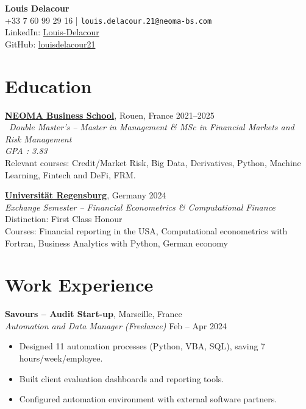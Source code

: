 \documentclass[10pt,a4paper]{article}
\begin{document}
\begin{center}
    {\LARGE \textbf{Louis Delacour}} \\
    \vspace{2mm}
    \small
    +33 7 60 99 29 16 \quad | \quad \texttt{louis.delacour.21@neoma-bs.com} \\
    LinkedIn: \href{https://www.linkedin.com/in/louis-delacour-70a530206/}{Louis-Delacour} \\ GitHub: \href{https://github.com/louisdelacour21}{louisdelacour21} \\
\end{center}

\vspace{0.05cm}

\section*{Education}
\textbf{\href{https://drive.google.com/drive/folders/1WzYw2E_0mfRNo33ZxSczjKHK1OzFjlqD?usp=sharing}{NEOMA Business School}}, Rouen, France \hfill 2021–2025 \\
\
\textit{Double Master’s – Master in Management \& MSc in Financial Markets and Risk Management} \\
\textit{GPA : 3.83} \\
Relevant courses: Credit/Market Risk, Big Data, Derivatives, Python, Machine Learning, Fintech and DeFi, FRM.

\textbf{\href{https://drive.google.com/drive/folders/1JJ2rY2UyCV3IehaStklcLUUJotaKgucl?usp=sharing}{Universität Regensburg}}, Germany \hfill 2024 \\
\textit{Exchange Semester – Financial Econometrics \& Computational Finance} \\
Distinction: First Class Honour \\
Courses: Financial reporting in the USA, Computational econometrics with Fortran, Business Analytics with Python, German economy 

\vspace{0.05cm}

\section*{Work Experience}

\textbf{Savours – Audit Start-up}, Marseille, France \\
\textit{Automation and Data Manager (Freelance)} \hfill Feb – Apr 2024
\begin{itemize}[leftmargin=1.5em, noitemsep]
    \item Designed 11 automation processes (Python, VBA, SQL), saving 7 hours/week/employee.
    \item Built client evaluation dashboards and reporting tools.
    \item Configured automation environment with external software partners.
\end{itemize}
\end{document}
